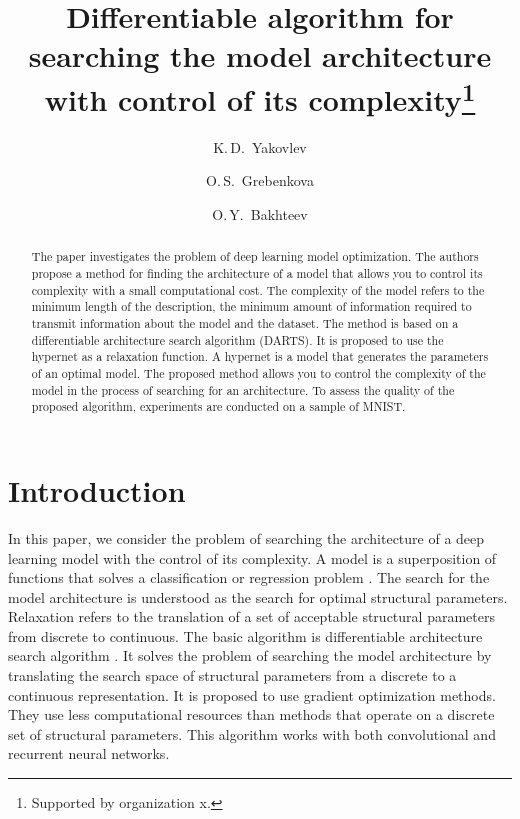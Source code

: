 \documentclass[runningheads]{llncs}
\begin{document}
%
\title{Differentiable algorithm for searching the model architecture with control of its complexity\thanks{Supported by organization x.}}
%
%
\author{K.\,D.~Yakovlev \and
O.\,S.~Grebenkova \and
O.\,Y.~Bakhteev}
%
%
\maketitle              %
%
\begin{abstract}
The paper investigates the problem of deep learning model optimization. The authors propose a method for finding the architecture of a model that allows you to control its complexity with a small computational cost. The complexity of the model refers to the minimum length of the description,
the minimum amount of information required to transmit information about the model and the dataset. The method is based on a differentiable architecture search algorithm (DARTS). It is proposed to use the hypernet as a relaxation function. A hypernet is a model that generates the parameters of an optimal model. The proposed method allows you to control the complexity of the model in the process of searching for an architecture. To assess the quality of the proposed algorithm, experiments are conducted on a sample of MNIST.

\end{abstract}
%
%
%
\section{Introduction}

In this paper, we consider the problem of searching the architecture of a deep learning model with the control of its complexity. A model is a superposition of functions that solves a classification or regression problem \cite{journals/aarc/BakhteevS18}. The search for the model architecture is understood as the search for optimal structural parameters. Relaxation refers to the translation of a set of acceptable structural parameters from discrete to continuous. The basic algorithm is differentiable architecture search algorithm \cite{journals/corr/abs-1806-09055}. It solves the problem of searching the model architecture by translating the search space of structural parameters from a discrete to a continuous representation. It is proposed to use gradient optimization methods. They use less computational resources than methods that operate on a discrete set of structural parameters. This algorithm works with both convolutional and recurrent neural networks.
\end{document}
